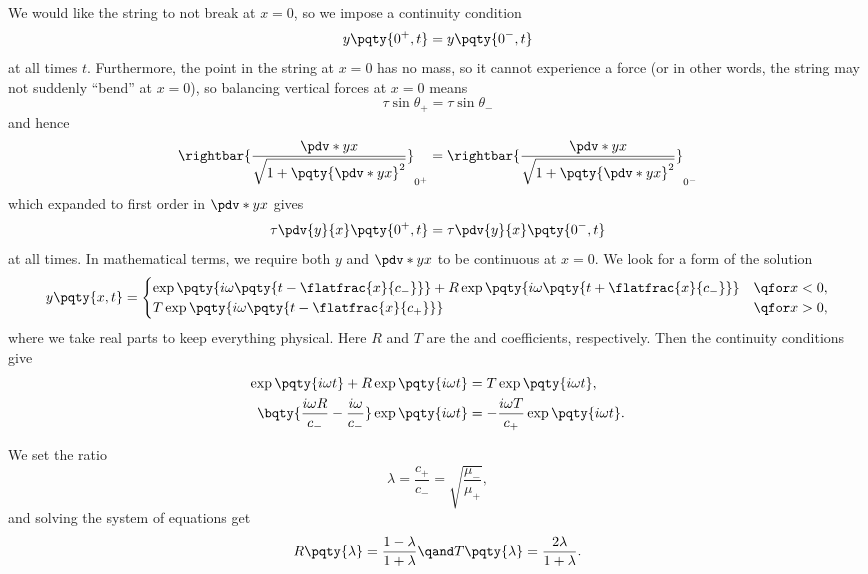 {We would like the string to not break at \(x = 0\), so we impose a continuity condition
\begin{equation}
    y\pqty{0^+, t} = y\pqty{0^-, t}
\end{equation}
at all times \(t\). Furthermore, the point in the string at \(x = 0\) has no mass, so it cannot experience a force (or in other words, the string may not suddenly ``bend'' at \(x = 0\)), so balancing vertical forces at \(x = 0\) means
\begin{equation}
    \tau \sin \theta_+ = \tau \sin \theta_-
\end{equation}
and hence
\begin{equation}
    \rightbar{\frac{\pdv*{y}{x}}{\sqrt{1 + \pqty{\pdv*{y}{x}}^2}}}_{0^+} = \rightbar{\frac{\pdv*{y}{x}}{\sqrt{1 + \pqty{\pdv*{y}{x}}^2}}}_{0^-}
\end{equation}
which expanded to first order in \(\pdv*{y}{x}\) gives
\begin{equation}
    \tau \pdv{y}{x} \pqty{0^+, t} = \tau \pdv{y}{x} \pqty{0^-, t}
\end{equation}
at all times. In mathematical terms, we require both \(y\) and \(\pdv*{y}{x}\) to be continuous at \(x = 0\). We look for a form of the solution
\begin{equation}
    y\pqty{x, t} = \begin{cases}
        \exp\pqty{i \omega \pqty{t - \flatfrac{x}{c_-}}} + R \exp\pqty{i \omega \pqty{t + \flatfrac{x}{c_-}}} &\qfor x < 0, \\
        T \exp\pqty{i \omega \pqty{t - \flatfrac{x}{c_+}}} &\qfor x > 0,
    \end{cases}
\end{equation}
where we take real parts to keep everything physical. Here \(R\) and \(T\) are the  and  coefficients, respectively. Then the continuity conditions give
\begin{subequations}
    \begin{align}
        \exp\pqty{i \omega t} + R \exp\pqty{i \omega t} &= T \exp\pqty{i \omega t}, \\
        \bqty{\frac{i \omega R}{c_-} - \frac{i \omega}{c_-}} \exp\pqty{i \omega t} &= - \frac{i \omega T}{c_+} \exp\pqty{i \omega t}.
    \end{align}
\end{subequations}

We set the ratio
\begin{equation}
    \lambda = \frac{c_+}{c_-} = \sqrt{\frac{\mu_-}{\mu_+}},
\end{equation}
and solving the system of equations get
\begin{equation}
    R\pqty{\lambda} = \frac{1 - \lambda}{1 + \lambda} \qand T\pqty{\lambda} = \frac{2 \lambda}{1 + \lambda}.
\end{equation}

}
